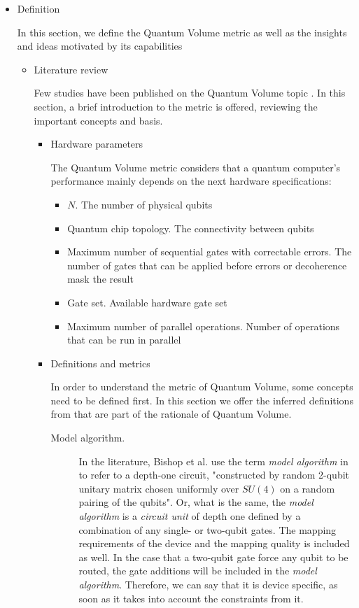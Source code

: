 \begin{itemize}
\item Definition
\label{sec:orgc495a95}

In this section, we define the Quantum Volume metric as well as the insights and ideas motivated by its capabilities

\begin{itemize}
\item Literature review
\label{sec:org677a301}

Few studies have been published on the Quantum Volume topic \cite{Bishop_2017,Moll_2018}.
In this section, a brief introduction to the metric is offered, reviewing the important concepts and basis.

\begin{itemize}
\item Hardware parameters
\label{sec:orgbb931b3}

The Quantum Volume metric considers that a quantum computer's performance mainly depends on the next hardware specifications:

\begin{itemize}
\item \(N\). The number of physical qubits
\item Quantum chip topology. The connectivity between qubits
\item Maximum number of sequential gates with correctable errors. The number of gates that can be applied before errors or decoherence mask the result
\item Gate set. Available hardware gate set
\item Maximum number of parallel operations. Number of operations that can be run in parallel
\end{itemize}

\item Definitions and metrics
\label{sec:org76fc6e0}

In order to understand the metric of Quantum Volume, some concepts need to be defined first. 
In this section we offer the inferred definitions from \cite{Bishop_2017,Moll_2018} that are part of the rationale of Quantum Volume.


\begin{description}
\item[{Model algorithm.}] In the literature, Bishop et al. use the term \emph{model algorithm} in \cite{Bishop_2017} to refer to a depth-one circuit, "constructed by random 2-qubit unitary matrix chosen uniformly over \(SU (4)\) on a random pairing of the qubits". Or, what is the same, the \emph{model algorithm} is a \emph{circuit unit} of depth one defined by a combination of any single- or two-qubit gates. The mapping requirements of the device and the mapping quality is included as well. In the case that a two-qubit gate force any qubit to be routed, the gate additions will be included in the \emph{model algorithm}. Therefore, we can say that it is device specific, as soon as it takes into account the constraints from it.
\end{description}


\end{itemize}
\end{itemize}
\end{itemize}
